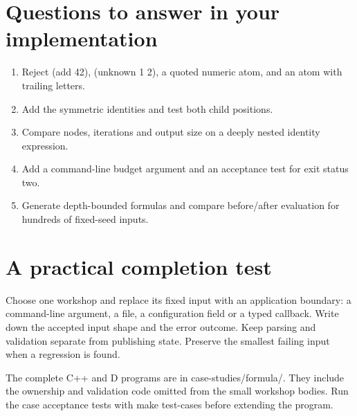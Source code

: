 \section*{Questions to answer in your implementation}
\begin{enumerate}
\item Reject (add 42), (unknown 1 2), a quoted numeric atom, and an atom with trailing letters.
\item Add the symmetric identities and test both child positions.
\item Compare nodes, iterations and output size on a deeply nested identity expression.
\item Add a command-line budget argument and an acceptance test for exit status two.
\item Generate depth-bounded formulas and compare before/after evaluation for hundreds of fixed-seed inputs.
\end{enumerate}
\section*{A practical completion test}
Choose one workshop and replace its fixed input with an application boundary: a command-line argument, a file, a configuration field or a typed callback. Write down the accepted input shape and the error outcome. Keep parsing and validation separate from publishing state. Preserve the smallest failing input when a regression is found.

The complete C++ and D programs are in case-studies/formula/. They include the ownership and validation code omitted from the small workshop bodies. Run the case acceptance tests with make test-cases before extending the program.

